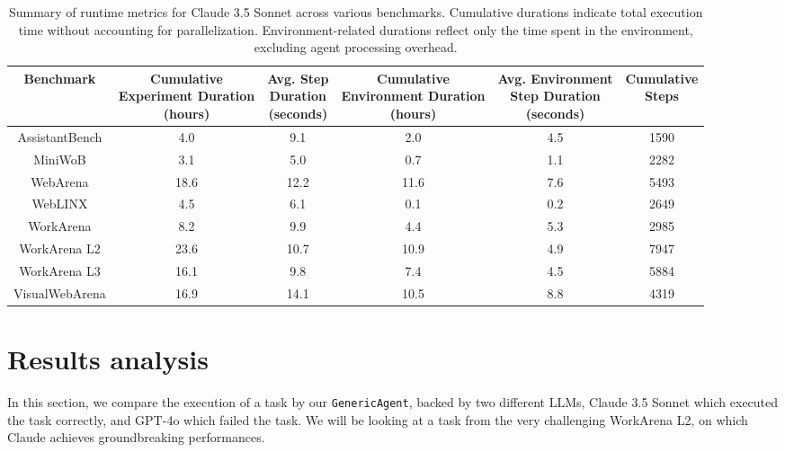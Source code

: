 \documentclass[10pt]{article} %
\newcommand{\code}[1]{\texttt{#1}}
\begin{document}
\begin{table}[h]
\centering
\footnotesize
\begin{tabular}{|c|c|c|c|c|c|}
\hline
\textbf{Benchmark} & \makecell{\textbf{Cumulative} \\ \textbf{Experiment Duration} \\ \textbf{(hours)}} & \makecell{\textbf{Avg. Step} \\ \textbf{Duration} \\ \textbf{(seconds)}} & \makecell{\textbf{Cumulative} \\ \textbf{Environment Duration} \\ \textbf{(hours)}} & \makecell{\textbf{Avg. Environment} \\ \textbf{Step Duration} \\ \textbf{(seconds)}} & \makecell{\textbf{Cumulative} \\ \textbf{Steps}} \\
\hline
AssistantBench  & 4.0  & 9.1  & 2.0  & 4.5  & 1590 \\
MiniWoB         & 3.1  & 5.0  & 0.7  & 1.1  & 2282 \\
WebArena        & 18.6 & 12.2 & 11.6 & 7.6  & 5493 \\
WebLINX         & 4.5  & 6.1  & 0.1  & 0.2  & 2649 \\
WorkArena       & 8.2  & 9.9  & 4.4  & 5.3  & 2985 \\
WorkArena L2   & 23.6 & 10.7 & 10.9 & 4.9  & 7947 \\
WorkArena L3   & 16.1 & 9.8  & 7.4  & 4.5  & 5884 \\
VisualWebArena  & 16.9 & 14.1 & 10.5 & 8.8  & 4319 \\
\hline
\end{tabular}
\caption{Summary of runtime metrics for Claude 3.5 Sonnet across various benchmarks. Cumulative durations indicate total execution time without accounting for parallelization. Environment-related durations reflect only the time spent in the environment, excluding agent processing overhead.}
\label{tab:benchmark_durations}
\end{table}



\section{Results analysis}\label{app:trace_analysis}

In this section, we compare the execution of a task by our \code{GenericAgent}, backed by two different LLMs, Claude 3.5 Sonnet which executed the task correctly, and GPT-4o which failed the task.
We will be looking at a task from the very challenging WorkArena L2, on which Claude achieves groundbreaking performances.
\end{document}

